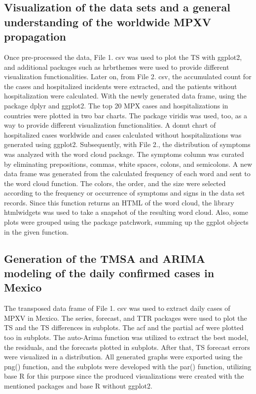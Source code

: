 \documentclass[conference]{IEEEtran}
\begin{document}
\subsection{Visualization of the data sets and a general understanding of the worldwide MPXV propagation}
Once pre-processed the data, File 1. csv was used to plot the TS with ggplot2, and additional packages such as hrbrthemes were used to provide different visualization functionalities. Later on, from File 2. csv, the accumulated count for the cases and hospitalized incidents were extracted, and the patients without hospitalization were calculated. With the newly generated data frame, using the package dplyr and ggplot2. The top 20 MPX cases and hospitalizations in countries were plotted in two bar charts. The package viridis was used, too, as a way to provide different visualization functionalities. A donut chart of hospitalized cases worldwide and cases calculated without hospitalizations was generated using ggplot2. Subsequently, with File 2., the distribution of symptoms was analyzed with the word cloud package. The symptoms column was curated by eliminating prepositions, commas, white spaces, colons, and semicolons. A new data frame was generated from the calculated frequency of each word and sent to the word cloud function. The colors, the order, and the size were selected according to the frequency or occurrence of symptoms and signs in the data set records. Since this function returns an HTML of the word cloud, the library htmlwidgets was used to take a snapshot of the resulting word cloud. Also, some plots were grouped using the package patchwork, summing up the ggplot objects in the given function.

\subsection{Generation of the TMSA and ARIMA modeling of the daily confirmed cases in Mexico}
The transposed data frame of File 1. csv was used to extract daily cases of MPXV in Mexico. The series, forecast, and TTR packages were used to plot the TS and the TS differences in subplots. The acf and the partial acf were plotted too in subplots. The auto-Arima function was utilized to extract the best model, the residuals, and the forecasts plotted in subplots. After that, TS forecast errors were visualized in a distribution. All generated graphs were exported using the png() function, and the subplots were developed with the par() function, utilizing base R for this purpose since the produced visualizations were created with the mentioned packages and base R without ggplot2.
\end{document}
